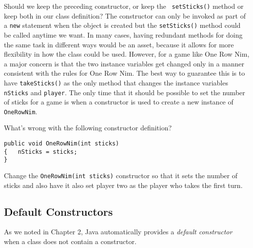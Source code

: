 Should we keep the preceding constructor, or keep the {\tt
setSticks()} method or keep both in our class definition?  The
constructor can only be invoked as part of a {\tt new} statement when
the object is created but the {\tt setSticks()} method could be called
anytime we want. In many cases, having redundant methods for doing the
same task in different ways would be an asset, because it allows for
more flexibility in how the class could be used.  However, for a game
like One Row Nim, a major concern is that the two instance variables
get changed only in a manner consistent with the rules for One Row
Nim.  The best way to guarantee this is to have {\tt takeSticks()} as
the only method that changes the instance variables {\tt nSticks} and
{\tt player}.  The only time that it should be possible to set the
number of sticks for a game is when a constructor is used to create a
new instance of {\tt OneRowNim}.


\label{self-study-exercises}
\begin{SSTUDY}
\item  What's wrong with the following
constructor definition?

\begin{jjjlisting}
\begin{lstlisting}
public void OneRowNim(int sticks)
{   nSticks = sticks;
}
\end{lstlisting}
\end{jjjlisting}

\item  Change the {\tt OneRowNim(int sticks)} constructor so
that it sets the number of sticks and also have it also set player two
as the player who takes the first turn.

\end{SSTUDY}

\subsection{Default Constructors}
\label{sec-defaultconstructors}
\noindent As we noted in Chapter 2, Java automatically provides a 
{\it default constructor} when a class does not contain a constructor.



